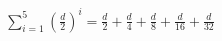 \documentclass[preview]{standalone}
\begin{document}
\begin{align*}
\sum_{i=1}^{5} \left(\frac{d}{2}\right)^i =\frac{d}{2} + \frac{d}{4} + \frac{d}{8} + \frac{d}{16} + \frac{d}{32}
\end{align*}
\end{document}
